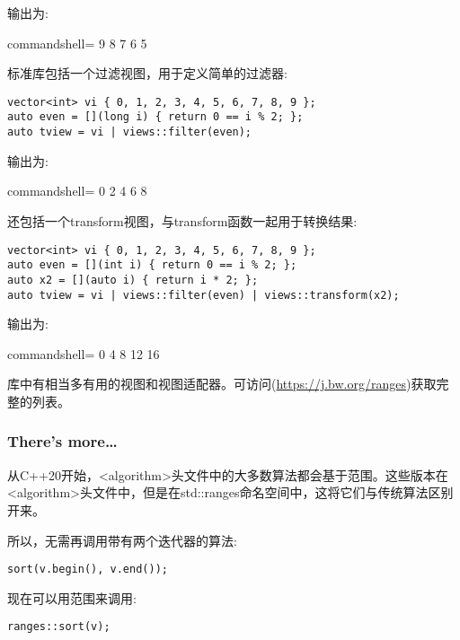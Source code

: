 输出为:

\begin{tcblisting}{commandshell={}}
9 8 7 6 5
\end{tcblisting}

标准库包括一个过滤视图，用于定义简单的过滤器:

\begin{lstlisting}[style=styleCXX]
vector<int> vi { 0, 1, 2, 3, 4, 5, 6, 7, 8, 9 };
auto even = [](long i) { return 0 == i % 2; };
auto tview = vi | views::filter(even);
\end{lstlisting}

输出为:

\begin{tcblisting}{commandshell={}}
0 2 4 6 8
\end{tcblisting}

还包括一个transform视图，与transform函数一起用于转换结果:

\begin{lstlisting}[style=styleCXX]
vector<int> vi { 0, 1, 2, 3, 4, 5, 6, 7, 8, 9 };
auto even = [](int i) { return 0 == i % 2; };
auto x2 = [](auto i) { return i * 2; };
auto tview = vi | views::filter(even) | views::transform(x2);
\end{lstlisting}

输出为:

\begin{tcblisting}{commandshell={}}
0 4 8 12 16
\end{tcblisting}

库中有相当多有用的视图和视图适配器。可访问(\url{https://j.bw.org/ranges})获取完整的列表。

\subsubsection{There's more…}

从C++20开始，<algorithm>头文件中的大多数算法都会基于范围。这些版本在<algorithm>头文件中，但是在std::ranges命名空间中，这将它们与传统算法区别开来。

所以，无需再调用带有两个迭代器的算法:

\begin{lstlisting}[style=styleCXX]
sort(v.begin(), v.end());
\end{lstlisting}

现在可以用范围来调用:

\begin{lstlisting}[style=styleCXX]
ranges::sort(v);
\end{lstlisting}

